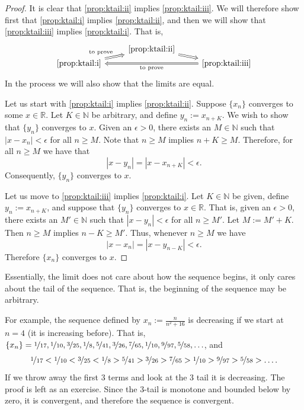 \documentclass[12pt]{book}
\newcommand{\abs}[1]{\left\lvert {#1} \right\rvert}
\newcommand{\R}{{\mathbb{R}}}
\newcommand{\N}{{\mathbb{N}}}
\theoremstyle{plain}
\theoremstyle{remark}
\theoremstyle{definition}
\theoremstyle{exercise}
\theoremstyle{example}
\begin{document}
\begin{proof}
It is clear that
\ref{prop:ktail:ii} implies \ref{prop:ktail:iii}.
We will therefore show first that
\ref{prop:ktail:i}
implies
\ref{prop:ktail:ii},
and then we will show that
\ref{prop:ktail:iii}
implies
\ref{prop:ktail:i}.  That is, 
\begin{equation*}
\begin{tikzcd}[row sep=0pt]
& \text{\ref{prop:ktail:ii}} \ar[dr, Rightarrow] & \\
\text{\ref{prop:ktail:i}} \ar[ur, Rightarrow, "\text{to prove}"] & &
\text{\ref{prop:ktail:iii}} \ar[ll, Rightarrow, "\text{to prove}"] 
\end{tikzcd}
\end{equation*}
In the process we will also show that the limits are equal.

Let us start with \ref{prop:ktail:i} implies \ref{prop:ktail:ii}.
Suppose $\{x_n \}$ converges to some $x \in \R$.
Let $K \in \N$ be arbitrary, and
define $y_n := x_{n+K}$.  We wish to show that $\{ y_n \}$ converges
to $x$.
Given an $\epsilon > 0$, there exists an $M \in \N$ such that
$\abs{x-x_n} < \epsilon$ for all $n \geq M$.
Note that $n \geq M$ implies $n+K \geq M$.  Therefore, for
all $n \geq M$ we have that 
\begin{equation*}
\abs{x-y_n} = \abs{x-x_{n+K}} < \epsilon .
\end{equation*}
Consequently, $\{ y_n \}$ converges to $x$.

Let us move to \ref{prop:ktail:iii} implies \ref{prop:ktail:i}.
Let $K \in \N$ be given, define
$y_n := x_{n+K}$, and suppose that $\{ y_n \}$ converges to $x \in \R$.
That is, given an $\epsilon > 0$, there exists an $M' \in \N$ such that
$\abs{x-y_n} < \epsilon$ for all $n \geq M'$.
Let $M := M'+K$.  Then $n \geq M$ implies $n-K \geq M'$.
Thus, whenever $n \geq M$ we have
\begin{equation*}
\abs{x-x_n} = \abs{x-y_{n-K}} < \epsilon.
\end{equation*}
Therefore $\{ x_n \}$ converges to $x$.
\end{proof}

Essentially, the limit does not care about how the sequence begins, it only
cares about the tail of the sequence.  That is, the beginning of the sequence
may be arbitrary.

For example, the sequence defined by $x_n := \frac{n}{n^2+16}$ is decreasing
if we start at $n=4$ (it is increasing before).  That is,
$\{ x_n \} =
\nicefrac{1}{17},
\nicefrac{1}{10},
\nicefrac{3}{25},
\nicefrac{1}{8},
\nicefrac{5}{41},
\nicefrac{3}{26},
\nicefrac{7}{65},
\nicefrac{1}{10},
\nicefrac{9}{97},
\nicefrac{5}{58},\ldots$, and 
\begin{equation*}
\nicefrac{1}{17} <
\nicefrac{1}{10} <
\nicefrac{3}{25} <
\nicefrac{1}{8} >
\nicefrac{5}{41} >
\nicefrac{3}{26} >
\nicefrac{7}{65} >
\nicefrac{1}{10} >
\nicefrac{9}{97} >
\nicefrac{5}{58} > \ldots .
\end{equation*}
If we throw away the first 3 terms
and look at the 3 tail it is decreasing.  The proof is left as an exercise.  Since the 3-tail
is monotone and bounded below by zero, it is convergent, and therefore the sequence is convergent.
\end{document}
